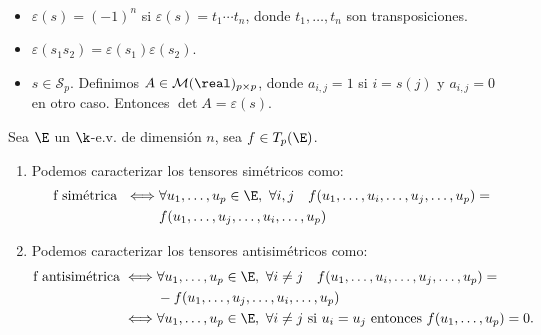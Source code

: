 \begin{obs}
    ~
    \begin{itemize}
        \item
            $ \varepsilon (s) = (-1)^n $ si $ \varepsilon (s) = t_1
            \cdots t_n $, donde $ t_1,\dots,t_n $ son transposiciones.
        \item
            $ \varepsilon (s_1 s_2) = \varepsilon (s_1) \varepsilon(s_2)
            $.
        \item
            $ s \in \mathcal{S}_p $.  Definimos $ A \in \mathcal{M}(\real)_
            {p\times p} $, donde $ a_{i,j} = 1 $ si $ i = s(j) $ y $ a_{i,j}
            = 0 $ en otro caso.  Entonces $ \det A = \varepsilon(s) $.
    \end{itemize}
\end{obs}
\begin{prop}
    \label{prop:sim_comp} Sea $ \E $ un $ \k $-e.v. de dimensión $ n $,
    sea $ f \in T_p(\E) $.
    \begin{enumerate}
        \item
            Podemos caracterizar los tensores simétricos como:
            \[
                \begin{split}
                    \text{f simétrica } \iff & \forall u_1,\dots,u_p
                    \in \E, \ \forall i,j \quad f(u_1,\dots,u_i,\dots,u_j,\dots,u_p)
                    = \\
                    &f(u_1,\dots,u_j,\dots,u_i,\dots,u_p)
                \end{split}
            \]
        \item
            Podemos caracterizar los tensores antisimétricos como:
            \[
                \begin{split}
                    \text{f antisimétrica} \iff & \forall u_1,\dots,u_p
                    \in \E, \ \forall i \neq j \quad f(u_1,\dots,u_i,\dots,u_j,\dots,u_p)
                    = \\
                    &-f(u_1,\dots,u_j,\dots,u_i,\dots,u_p)\\
                    \iff& \forall u_1,\dots,u_p \in \E, \ \forall i \neq
                    j \text{ si } u_i=u_j \text{ entonces } f(u_1,\dots,u_p)
                    = 0.
                \end{split}
            \]
    \end{enumerate}
\end{prop}
